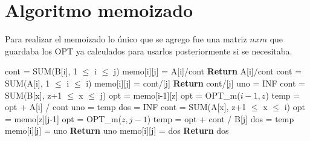\documentclass[12pt]{article}
\newcommand{\TITLE}[1]{\item[#1]}
\newcommand{\algcost}[2]{\strut\hfill\makebox[1.5cm][l]{#1}\makebox[4cm][l]{#2}}
\begin{document}
\section{Algoritmo memoizado}
Para realizar el memoizado lo único que se agrego fue una matriz $n x m$ que guardaba los OPT ya calculados para usarlos posteriormente si se necesitaba.

\begin{algorithmic}[1]
\TITLE{\textsc{opt\_m}$(i ,j)$}
    \IF{i = 0  \algcost{$.$}{$.$}}
        \STATE cont = SUM(B[i], 1 $\leq$ i $\leq$ j)
        \STATE memo[i][j] = A[i]/cont
        \STATE \textbf{Return} A[i]/cont
    \ENDIF
        \STATE cont = SUM(A[i], 1 $\leq$ i $\leq$ i)
        \STATE memo[i][j] = cont/[j]
        \STATE \textbf{Return} cont/[j]
    \ENDIF
    \STATE
    \STATE uno  = INF
        \STATE cont = SUM(B[x], z+1 $\leq$ x $\leq$ j)
            opt = memo[i-1][z]
        \ELSE
            opt = OPT\_m($i-1,z$)
        \ENDIF 
        \STATE temp = opt + A[i] / cont
            \STATE uno = temp
        \ENDIF
    \ENDFOR
    \STATE
    \STATE dos = INF
        \STATE cont = SUM(A[x], z+1 $\leq$ x $\leq$ i)
            opt = memo[z][j-1]
        \ELSE
            opt = OPT\_m($z,j-1$)
        \ENDIF
        \STATE temp = opt + cont / B[j]
            \STATE dos = temp
        \ENDIF
    \ENDFOR
        \STATE memo[i][j] = uno
        \STATE \textbf{Return} uno
    \ELSE
        \STATE memo[i][j] = dos
        \STATE \textbf{Return} dos
    \ENDIF
\end{algorithmic}
\end{document}
